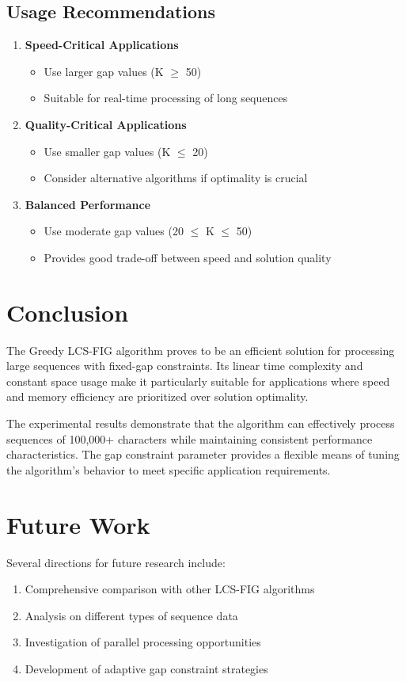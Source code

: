 \documentclass[11pt,a4paper]{article}
\begin{document}
\subsection{Usage Recommendations}

\begin{enumerate}
    \item \textbf{Speed-Critical Applications}
    \begin{itemize}
        \item Use larger gap values (K $\geq$ 50)
        \item Suitable for real-time processing of long sequences
    \end{itemize}
    
    \item \textbf{Quality-Critical Applications}
    \begin{itemize}
        \item Use smaller gap values (K $\leq$ 20)
        \item Consider alternative algorithms if optimality is crucial
    \end{itemize}
    
    \item \textbf{Balanced Performance}
    \begin{itemize}
        \item Use moderate gap values (20 $\leq$ K $\leq$ 50)
        \item Provides good trade-off between speed and solution quality
    \end{itemize}
\end{enumerate}

\section{Conclusion}

The Greedy LCS-FIG algorithm proves to be an efficient solution for processing large sequences with fixed-gap constraints. Its linear time complexity and constant space usage make it particularly suitable for applications where speed and memory efficiency are prioritized over solution optimality.

The experimental results demonstrate that the algorithm can effectively process sequences of 100,000+ characters while maintaining consistent performance characteristics. The gap constraint parameter provides a flexible means of tuning the algorithm's behavior to meet specific application requirements.

\section{Future Work}

Several directions for future research include:
\begin{enumerate}
    \item Comprehensive comparison with other LCS-FIG algorithms
    \item Analysis on different types of sequence data
    \item Investigation of parallel processing opportunities
    \item Development of adaptive gap constraint strategies
\end{enumerate}
\end{document}
